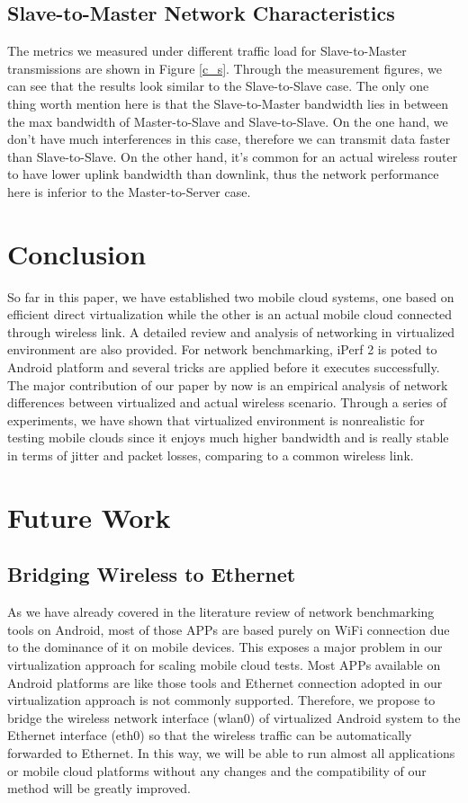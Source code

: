 \documentclass[journal,comsoc]{IEEEtran}
\begin{document}
\subsection{Slave-to-Master Network Characteristics}
The metrics we measured under different traffic load for Slave-to-Master transmissions are shown in Figure \ref{c_s}. Through the measurement figures, we can see that the results look similar to the Slave-to-Slave case. The only one thing worth mention here is that the Slave-to-Master bandwidth lies in between the max bandwidth of Master-to-Slave and Slave-to-Slave. On the one hand, we don't have much interferences in this case, therefore we can transmit data faster than Slave-to-Slave. On the other hand, it's common for an actual wireless router to have lower uplink bandwidth than downlink, thus the network performance here is inferior to the Master-to-Server case.

\section{Conclusion}
So far in this paper, we have established two mobile cloud systems, one based on efficient direct virtualization while the other is an actual mobile cloud connected through wireless link. A detailed review and analysis of networking in virtualized environment are also provided.  For network benchmarking, iPerf 2 is poted to Android platform and several tricks are applied before it executes successfully. The major contribution of our paper by now is an empirical analysis of network differences between virtualized and actual wireless scenario. Through a series of experiments, we have shown that virtualized environment is nonrealistic for testing mobile clouds since it enjoys much higher bandwidth and is really stable in terms of jitter and packet losses, comparing to a common wireless link.

\section{Future Work}
\subsection{Bridging Wireless to Ethernet}
As we have already covered in the literature review of network benchmarking tools on Android, most of those APPs are based purely on WiFi connection due to the dominance of it on mobile devices. This exposes a major problem in our virtualization approach for scaling mobile cloud tests. Most APPs available on Android platforms are like those tools and Ethernet connection adopted in our virtualization approach is not commonly supported. Therefore, we propose to bridge the wireless network interface (wlan0) of virtualized Android system to the Ethernet interface (eth0) so that the wireless traffic can be automatically forwarded to Ethernet. In this way, we will be able to run almost all applications or mobile cloud platforms without any changes and the compatibility of our method will be greatly improved.
\end{document}

